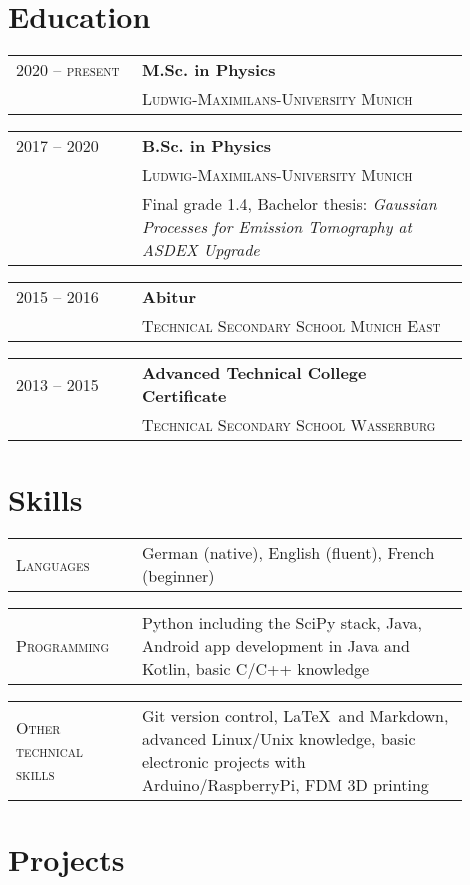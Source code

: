 \documentclass[a4paper, ]{article}
\newenvironment{cventry}[2]
{   
    \setlength{\tabcolsep}{1.25em}
    \hypersetup{urlcolor=black}
    \begin{center}\hspace{-1.25cm}\begin{tabular}{p{0.25\linewidth}|p{0.65\linewidth}}
    \raggedleft\scshape #1 & \bfseries#2 \vspace{0.1cm}\\ & 
}
{\end{tabular}\end{center}}
\newenvironment{cventrynoheading}[1]
{
    \setlength{\tabcolsep}{1.25em}
    \begin{center}\hspace{-1.25cm}\begin{tabular}{p{0.25\linewidth}|p{0.65\linewidth}}
    \raggedleft\scshape #1 & 
}
{\end{tabular}\end{center}}
\newcommand{\newentryline}{\\&}
\begin{document}
\section{Education}

\begin{cventry}{2020 -- present}
    {M.Sc. in Physics}
    \scshape Ludwig-Maximilans-University Munich
\end{cventry}

\begin{cventry}{2017 -- 2020}
    {B.Sc. in Physics}
    \scshape Ludwig-Maximilans-University Munich \newentryline Final grade 1.4, 
    Bachelor thesis: \slshape Gaussian Processes for Emission Tomography at 
    ASDEX Upgrade \href{https://gitlab.mpcdf.mpg.de/komo/bachelorarbeit}{\normalfont\faLink}
\end{cventry}

\begin{cventry}{2015 -- 2016}
    {Abitur}
    \scshape  Technical Secondary School Munich East
\end{cventry}

\begin{cventry}{2013 -- 2015}
    {Advanced Technical College Certificate}
    \scshape Technical Secondary School Wasserburg
\end{cventry}


\section{Skills}

\begin{cventrynoheading}{Languages}
    German (native), English (fluent), French (beginner)
\end{cventrynoheading}

\begin{cventrynoheading}{Programming}
    Python including the SciPy stack, Java, Android app development 
    in Java and Kotlin, basic C/C++ knowledge
\end{cventrynoheading}

\begin{cventrynoheading}{Other technical skills}
    Git version control, \LaTeX\ and Markdown, advanced Linux/Unix knowledge, 
    basic electronic projects with Arduino/RaspberryPi, FDM 3D printing
\end{cventrynoheading}


\section{Projects}
\end{document}
